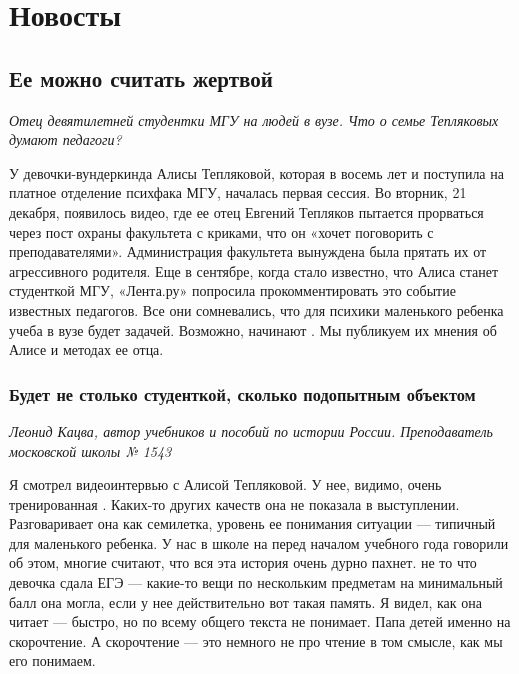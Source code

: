 
\chapter{Новосты}

\section{Ее можно считать жертвой}
\textit{Отец девятилетней студентки МГУ  на людей в вузе. Что о семье Тепляковых думают педагоги?}

У девочки-вундеркинда Алисы Тепляковой, которая в восемь лет  и поступила на платное отделение психфака МГУ, началась первая сессия. Во вторник, 21 декабря, появилось видео, где ее отец Евгений Тепляков пытается прорваться через пост охраны факультета с криками, что он «хочет поговорить с преподавателями». Администрация факультета вынуждена была прятать их от агрессивного родителя. Еще в сентябре, когда стало известно, что Алиса станет студенткой МГУ, «Лента.ру» попросила прокомментировать это событие известных педагогов. Все они сомневались, что для психики маленького ребенка учеба в вузе будет  задачей. Возможно,  начинают . Мы публикуем их мнения об Алисе и методах ее отца.

\subsection{Будет не столько студенткой, сколько подопытным объектом}
\textit{Леонид Кацва, автор учебников и пособий по истории России. Преподаватель московской школы № 1543}

Я смотрел видеоинтервью с Алисой Тепляковой. У нее, видимо, очень тренированная . Каких-то других качеств она не показала в выступлении. Разговаривает она как семилетка, уровень ее понимания ситуации --- типичный для маленького ребенка. У нас в школе на  перед началом учебного года говорили об этом, многие считают, что вся эта история очень дурно пахнет.  не то что девочка сдала ЕГЭ ---  какие-то вещи по нескольким предметам на минимальный балл она могла, если у нее действительно вот такая память. Я видел, как она читает --- быстро, но  по всему общего  текста не понимает. Папа  детей именно на скорочтение. А скорочтение --- это немного не про чтение в том смысле, как мы его понимаем.

